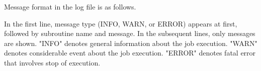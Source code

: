Message format in the log file is as follows.


In the first line, message type (INFO, WARN, or ERROR) appears at first, followed by subroutine name and message.
In the subsequent lines, only messages are shown.
"INFO" denotes general information about the job execution.
"WARN" denotes considerable event about the job execution.
"ERROR" denotes fatal error that involves stop of execution.
